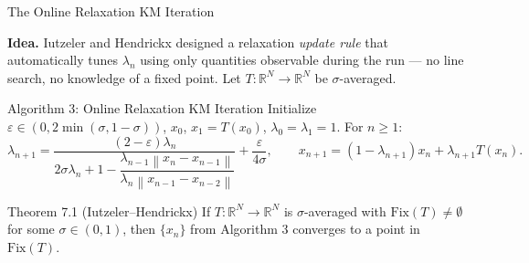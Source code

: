 \documentclass[aspectratio=169,10pt]{beamer}
\newcommand{\norm}[1]{\left\|#1\right\|}
\newcommand{\Fix}{\mathrm{Fix}}
\newcommand{\R}{\mathbb{R}}
\begin{document}
\begin{frame}{The Online Relaxation KM Iteration}

  \textbf{Idea.} Iutzeler and Hendrickx designed a relaxation
  \emph{update rule} that automatically tunes $\lambda_n$ using only
  quantities observable during the run --- no line search, no
  knowledge of a fixed point. Let $T:\R^N\to\R^N$ be $\sigma$-averaged.

  \begin{block}{Algorithm 3: Online Relaxation KM Iteration}
    Initialize $\varepsilon\in(0,2\min(\sigma,1-\sigma))$, $x_0$,
    $x_1=T(x_0)$, $\lambda_0=\lambda_1=1$. For $n\ge1$:
    \[
      \lambda_{n+1} =
        \frac{(2-\varepsilon)\lambda_n}
             {2\sigma\lambda_n+1-\dfrac{\lambda_{n-1}\norm{x_n-x_{n-1}}}
                                        {\lambda_n\norm{x_{n-1}-x_{n-2}}}}
        + \frac{\varepsilon}{4\sigma},
      \qquad
      x_{n+1} = (1-\lambda_{n+1})x_n+\lambda_{n+1}T(x_n).
    \]
  \end{block}

  \begin{alertblock}{Theorem 7.1 (Iutzeler--Hendrickx)}
    If $T:\R^N\to\R^N$ is $\sigma$-averaged with $\Fix(T)\neq\emptyset$
    for some $\sigma\in(0,1)$, then $\{x_n\}$ from Algorithm 3
    converges to a point in $\Fix(T)$.
  \end{alertblock}

\end{frame}
\end{document}
